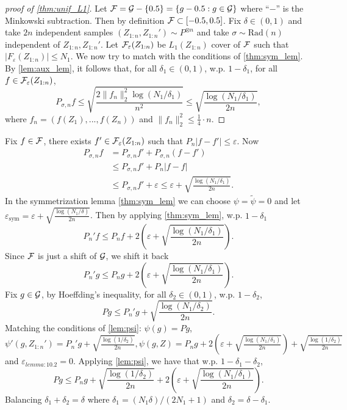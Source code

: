 \documentclass[twoside]{article}
\newcommand{\Fc}{\cF_\varepsilon(Z_{1:n})}
\begin{document}
 \begin{proof}[proof of \cref{thm:unif_L1}]
    Let $\mathcal{F}=\mathcal{G}-\{0.5\}=\{g-0.5:g\in \mathcal{G}\}$ where ``$-$'' is the Minkowski subtraction. Then by definition $\mathcal{F}\subset [-0.5,0.5]$. Fix $\delta\in (0,1)$ and take $2n$ independent samples $(Z_{1:n},Z_{1:n}')\sim P^{\otimes n}$ and take $\sigma\sim \mathrm{Rad}(n)$ independent of $Z_{1:n}, Z_{1:n}'$. Let $\mathcal{F}_\varepsilon(Z_{1:n})$ be $L_1(Z_{1:n})$ cover of $\mathcal{F}$ such that $|F_\varepsilon(Z_{1:n})|\le N_1$. We now try to match with the conditions of \cref{thm:sym_lem}. By \cref{lem:aux_lem}, it follows that, for all $\delta_1\in (0,1)$, w.p. $1-\delta_1$, for all $f\in \mathcal{F}_\varepsilon(Z_{1:n})$,
    \begin{equation*}
        P_{\sigma,n}f \le \sqrt{\frac{2\|f_n\|_2^2\log(N_1/\delta_1)}{n^2}}\le \sqrt{\frac{\log(N_1/\delta_1)}{2n}},
    \end{equation*}
    where $f_n=(f(Z_1),...,f(Z_n))$ and $\|f_n\|_2^2\le \frac{1}{4}\cdot n$.
 \end{proof}
 Fix $f\in \mathcal{F}$, there exists $f'\in \Fc$ such that $P_n|f-f'|\le \varepsilon$. Now 
 \begin{align*}
    P_{\sigma,n}f&= P_{\sigma, n}f'+P_{\sigma,n}(f-f')\\
    &\le P_{\sigma,n}f'+P_n|f-f|\\
    &\le P_{\sigma,n}f'+\varepsilon\le \varepsilon+\sqrt{\frac{\log(N_1/\delta_1)}{2n}}.
 \end{align*}
 In the symmetrization lemma \cref{thm:sym_lem} we can choose $\psi=\tilde \psi=0$ and let $\varepsilon_{\text{sym}}=\varepsilon+\sqrt{\frac{\log(N_1/\delta)}{2n}}$. Then by applying \cref{thm:sym_lem}, w.p. $1-\delta_1$
 \[P_n'f\le P_nf + 2\left(\varepsilon+\sqrt{\frac{\log(N_1/\delta_1)}{2n}}\right).\]
 Since $\mathcal{F}$ is just a shift of $\mathcal{G}$, we shift it back
 \[P_n'g\le P_ng + 2\left(\varepsilon+\sqrt{\frac{\log(N_1/\delta_1)}{2n}}\right).\]
 Fix $g\in \mathcal{G}$, by Hoeffding's inequality, for all $\delta_2\in (0,1)$, w.p. $1-\delta_2$,
 \begin{equation*}
    Pg\le P_n'g+\sqrt{\frac{\log(N_1/\delta_2)}{2n}}.
 \end{equation*}
 Matching the conditions of \cref{lem:psi}: $\psi(g)=Pg$, $\psi'(g,Z_{1:n}')=P_n'g+\sqrt{\frac{\log(1/\delta_2)}{2n}},\psi(g,Z)=P_ng+2\left(\varepsilon+\sqrt{\frac{\log(N_1/\delta_1)}{2n}}\right)+\sqrt{\frac{\log(1/\delta_2)}{2n}}$ and $\varepsilon_{lemma:10.2}=0$. Applying \cref{lem:psi}, we have that w.p. $1-\delta_1-\delta_2$,
 \begin{equation*}
    Pg \le P_ng +\sqrt{\frac{\log(1/\delta_2)}{2n}}+2\left(\varepsilon+\sqrt{\frac{\log(N_1/\delta_1)}{2n}}\right).
 \end{equation*}
Balancing $\delta_1+\delta_2=\delta$ where $\delta_1=(N_1\delta)/(2N_1+1)$ and $\delta_2=\delta-\delta_1$.
\end{document}
